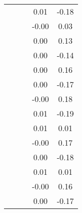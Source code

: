 \begin{table}
\begin{tabular}{c|cc|cc|}
\multicolumn{1}{|c|}{} & \multicolumn{1}{|c|}{} & \multicolumn{1}{|c|}{} & \multicolumn{1}{|c|}{      0.01} & \multicolumn{1}{|c|}{     -0.18} \\ 
\multicolumn{1}{|c|}{} & \multicolumn{1}{|c|}{} & \multicolumn{1}{|c|}{} & \multicolumn{1}{|c|}{     -0.00} & \multicolumn{1}{|c|}{      0.03} \\ 
\multicolumn{1}{|c|}{} & \multicolumn{1}{|c|}{} & \multicolumn{1}{|c|}{} & \multicolumn{1}{|c|}{      0.00} & \multicolumn{1}{|c|}{      0.13} \\ 
\multicolumn{1}{|c|}{} & \multicolumn{1}{|c|}{} & \multicolumn{1}{|c|}{} & \multicolumn{1}{|c|}{      0.00} & \multicolumn{1}{|c|}{     -0.14} \\ 
\multicolumn{1}{|c|}{} & \multicolumn{1}{|c|}{} & \multicolumn{1}{|c|}{} & \multicolumn{1}{|c|}{      0.00} & \multicolumn{1}{|c|}{      0.16} \\ 
\multicolumn{1}{|c|}{} & \multicolumn{1}{|c|}{} & \multicolumn{1}{|c|}{} & \multicolumn{1}{|c|}{      0.00} & \multicolumn{1}{|c|}{     -0.17} \\ 
\multicolumn{1}{|c|}{} & \multicolumn{1}{|c|}{} & \multicolumn{1}{|c|}{} & \multicolumn{1}{|c|}{     -0.00} & \multicolumn{1}{|c|}{      0.18} \\ 
\multicolumn{1}{|c|}{} & \multicolumn{1}{|c|}{} & \multicolumn{1}{|c|}{} & \multicolumn{1}{|c|}{      0.01} & \multicolumn{1}{|c|}{     -0.19} \\ 
\multicolumn{1}{|c|}{} & \multicolumn{1}{|c|}{} & \multicolumn{1}{|c|}{} & \multicolumn{1}{|c|}{      0.01} & \multicolumn{1}{|c|}{      0.01} \\ 
\multicolumn{1}{|c|}{} & \multicolumn{1}{|c|}{} & \multicolumn{1}{|c|}{} & \multicolumn{1}{|c|}{     -0.00} & \multicolumn{1}{|c|}{      0.17} \\ 
\multicolumn{1}{|c|}{} & \multicolumn{1}{|c|}{} & \multicolumn{1}{|c|}{} & \multicolumn{1}{|c|}{      0.00} & \multicolumn{1}{|c|}{     -0.18} \\ 
\multicolumn{1}{|c|}{} & \multicolumn{1}{|c|}{} & \multicolumn{1}{|c|}{} & \multicolumn{1}{|c|}{      0.01} & \multicolumn{1}{|c|}{      0.01} \\ 
\multicolumn{1}{|c|}{} & \multicolumn{1}{|c|}{} & \multicolumn{1}{|c|}{} & \multicolumn{1}{|c|}{     -0.00} & \multicolumn{1}{|c|}{      0.16} \\ 
\multicolumn{1}{|c|}{} & \multicolumn{1}{|c|}{} & \multicolumn{1}{|c|}{} & \multicolumn{1}{|c|}{      0.00} & \multicolumn{1}{|c|}{     -0.17} \\ 

\end{tabular}
\end{table}
